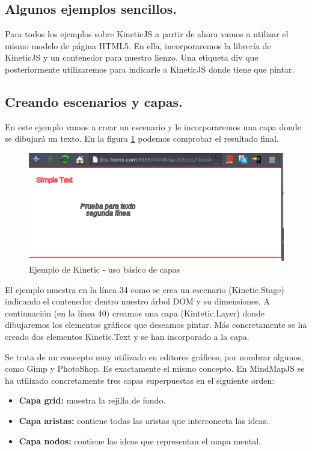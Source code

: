 \subsection{Algunos ejemplos sencillos.}
Para todos los ejemplos sobre KineticJS a partir de ahora vamos a utilizar el mismo modelo de página HTML5. En ella, incorporaremos la librería de KineticJS y un contenedor para nuestro lienzo. Una etiqueta div que posteriormente utilizaremos para indicarle a KineticJS donde tiene que pintar.
 


\subsection{Creando escenarios y capas.}

En este ejemplo vamos a crear un escenario y le incorporaremos una capa donde se dibujará un texto. En la figura \ref{fig:kinetic-ejemplo-escenarios-capas} podemos comprobar el resultado final.

\begin{figure}[tbph]
\centering
\includegraphics[width=0.6\linewidth]{imagenes/KineticjsEjemplo0.png}
\caption{Ejemplo de Kinetic - uso básico de capas}
\label{fig:kinetic-ejemplo-escenarios-capas}
\end{figure}



El ejemplo muestra en la línea 34 como se crea un escenario (Kinetic.Stage) indicando el contenedor dentro nuestro árbol DOM y su dimensiones. A continuación (en la línea 40) creamos una capa (Kintetic.Layer) donde dibujaremos los elementos gráficos que deseamos pintar. Más concretamente se ha creado dos elementos Kinetic.Text y se han incorporado a la capa.

Se trata de un concepto muy utilizado en editores gráficos, por nombrar algunos, como Gimp y PhotoShop. Es exactamente el mismo concepto. En MindMapJS se ha utilizado concretamente tres capas superpuestas en el siguiente orden:
\begin{itemize}
\item \textbf{Capa grid:} muestra la rejilla de fondo.
\item \textbf{Capa aristas:} contiene todas las aristas que interconecta las ideas. 
\item \textbf{Capa nodos:} contiene las ideas que representan el mapa mental.
\end{itemize}


